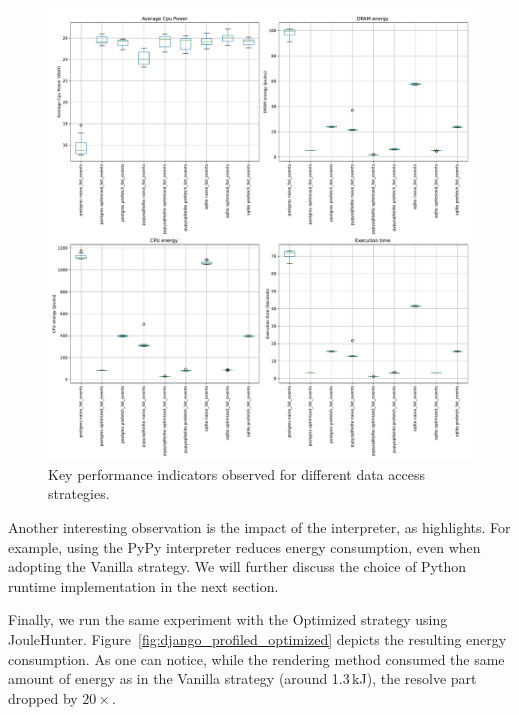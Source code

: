 \begin{figure}[!hbt]
    \centering
    \includegraphics[width=\linewidth]{imgs/django}
    \caption{Key performance indicators observed for different data access strategies.}
    \label{fig:django}
\end{figure}

Another interesting observation is the impact of the interpreter, as  highlights.
For example, using the \textsf{PyPy} interpreter reduces energy consumption, even when adopting the \textsf{Vanilla} strategy.
We will further discuss the choice of Python runtime implementation in the next section.

Finally, we run the same experiment with the \textsf{Optimized} strategy using JouleHunter.
Figure~\ref{fig:django_profiled_optimized} depicts the resulting energy consumption.
As one can notice, while the rendering method consumed the same amount of energy as in the \textsf{Vanilla} strategy (around 1.3\,kJ), the resolve part dropped by $20\times$.


